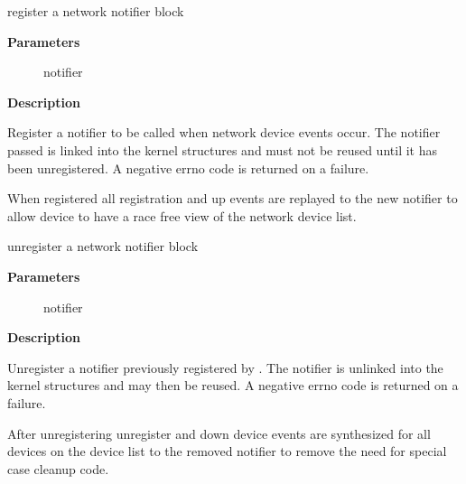 \documentclass[a4paper,8pt,english]{sphinxmanual}
\begin{document}
\begin{fulllineitems}
\label{networking/kapi:c.register_netdevice_notifier}
register a network notifier block

\end{fulllineitems}


\textbf{Parameters}
\begin{description}
\item[{}] \leavevmode
notifier

\end{description}

\textbf{Description}

Register a notifier to be called when network device events occur.
The notifier passed is linked into the kernel structures and must
not be reused until it has been unregistered. A negative errno code
is returned on a failure.

When registered all registration and up events are replayed
to the new notifier to allow device to have a race free
view of the network device list.

\begin{fulllineitems}
\label{networking/kapi:c.unregister_netdevice_notifier}
unregister a network notifier block

\end{fulllineitems}


\textbf{Parameters}
\begin{description}
\item[{}] \leavevmode
notifier

\end{description}

\textbf{Description}

Unregister a notifier previously registered by
{\hyperref[networking/kapi:c.register_netdevice_notifier]{\emph{}}}. The notifier is unlinked into the
kernel structures and may then be reused. A negative errno code
is returned on a failure.

After unregistering unregister and down device events are synthesized
for all devices on the device list to the removed notifier to remove
the need for special case cleanup code.
\end{document}
